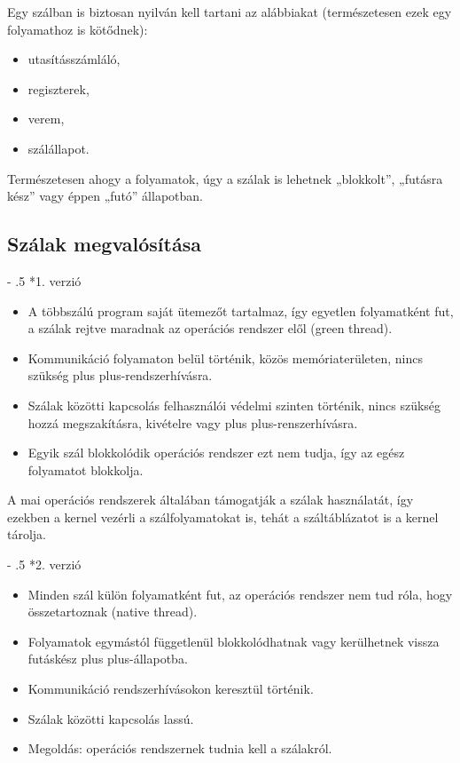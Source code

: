 \documentclass[tikz,12pt,margin=0px]{article}
\makeatletter
\renewcommand\paragraph{%
	\@startsection{paragraph}{4}{0mm}%
	{-\baselineskip}%
	{.5\baselineskip}%
	{\normalfont\normalsize\bfseries}}
\newcommand\lword[1]{\leavevmode\nobreak\hskip0pt plus\linewidth\penalty50\hskip0pt plus-\linewidth\nobreak #1}
\makeatother
\begin{document}
    \noindent Egy szálban is biztosan nyilván kell tartani az alábbiakat (természetesen ezek egy folyamathoz is kötődnek):
    \begin{itemize}[topsep=8pt,itemsep=4pt,partopsep=4pt, parsep=4pt]
        \item utasításszámláló,
        \item regiszterek,
        \item verem,
        \item szálállapot.
    \end{itemize}

    \noindent Természetesen ahogy a folyamatok, úgy a szálak is lehetnek „blokkolt”, „futásra kész” vagy éppen „futó” állapotban.
\newpage
    \subsection*{Szálak megvalósítása\\}

    \paragraph*{1. verzió}
    \begin{itemize}[topsep=8pt,itemsep=4pt,partopsep=4pt, parsep=4pt]
        \item A többszálú program saját ütemezőt tartalmaz, így egyetlen folyamatként fut, a szálak rejtve maradnak az operációs rendszer elől (green thread).
        \item Kommunikáció folyamaton belül történik, közös memóriaterületen, nincs szükség \lword{rendszerhívásra}.
        \item Szálak közötti kapcsolás felhasználói védelmi szinten történik, nincs szükség hozzá megszakításra, kivételre vagy \lword{renszerhívásra}.
        \item Egyik szál blokkolódik operációs rendszer ezt nem tudja, így az egész folyamatot blokkolja.
    \end{itemize}

    \noindent A mai operációs rendszerek általában támogatják a szálak használatát, így ezekben a kernel vezérli a szálfolyamatokat is, tehát a száltáblázatot is a kernel tárolja.

    \paragraph*{2. verzió}
    \begin{itemize}[topsep=8pt,itemsep=4pt,partopsep=4pt, parsep=4pt]
        \item  Minden szál külön folyamatként fut, az operációs rendszer nem tud róla, hogy összetartoznak (native thread).
        \item  Folyamatok egymástól függetlenül blokkolódhatnak vagy kerülhetnek vissza futáskész \lword{állapotba}.
        \item  Kommunikáció rendszerhívásokon keresztül történik.
        \item  Szálak közötti kapcsolás lassú.
        \item  Megoldás: operációs rendszernek tudnia kell a szálakról.
    \end{itemize}
\end{document}
